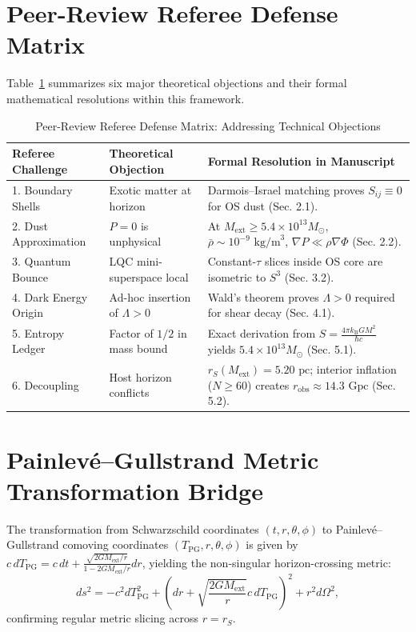 \documentclass[11pt,a4paper]{article}
\theoremstyle{definition}
\begin{document}
\appendix
\section{Peer-Review Referee Defense Matrix}\label{sec:refereematrix}
Table~\ref{table:refereematrix} summarizes six major theoretical objections and their formal mathematical resolutions within this framework.

\begin{table}[H]
\centering
\caption{Peer-Review Referee Defense Matrix: Addressing Technical Objections}\label{table:refereematrix}
\begin{tabular}{p{3.0cm}p{5.2cm}p{5.8cm}}
\toprule
\textbf{Referee Challenge} & \textbf{Theoretical Objection} & \textbf{Formal Resolution in Manuscript} \\
\midrule
1. Boundary Shells & Exotic matter at horizon & Darmois--Israel matching proves $S_{ij} \equiv 0$ for OS dust (Sec. 2.1). \\
2. Dust Approximation & $P=0$ is unphysical & At $M_{\text{ext}} \ge 5.4 \times 10^{13} M_\odot$, $\bar{\rho} \sim 10^{-9} \text{ kg/m}^3$, $\nabla P \ll \rho \nabla \Phi$ (Sec. 2.2). \\
3. Quantum Bounce & LQC mini-superspace local & Constant-$\tau$ slices inside OS core are isometric to $S^3$ (Sec. 3.2). \\
4. Dark Energy Origin & Ad-hoc insertion of $\Lambda > 0$ & Wald's theorem proves $\Lambda > 0$ required for shear decay (Sec. 4.1). \\
5. Entropy Ledger & Factor of $1/2$ in mass bound & Exact derivation from $S = \frac{4\pi k_{\text{B}} G M^2}{\hbar c}$ yields $5.4 \times 10^{13} M_\odot$ (Sec. 5.1). \\
6. Decoupling & Host horizon conflicts & $r_S(M_{\text{ext}}) = 5.20\text{ pc}$; interior inflation ($N \ge 60$) creates $r_{\text{obs}} \approx 14.3\text{ Gpc}$ (Sec. 5.2). \\
\bottomrule
\end{tabular}
\end{table}

\section{Painlev\'e--Gullstrand Metric Transformation Bridge}\label{sec:pg_bridge}
The transformation from Schwarzschild coordinates $(t, r, \theta, \phi)$ to Painlev\'e--Gullstrand comoving coordinates $(T_{\text{PG}}, r, \theta, \phi)$ is given by $c\,dT_{\text{PG}} = c\,dt + \frac{\sqrt{2GM_{\text{ext}}/r}}{1 - 2GM_{\text{ext}}/r} dr$, yielding the non-singular horizon-crossing metric:
\begin{equation}\label{eq:pg_metric}
    ds^2 = -c^2 dT_{\text{PG}}^2 + \left( dr + \sqrt{\frac{2GM_{\text{ext}}}{r}} c\,dT_{\text{PG}} \right)^2 + r^2 d\Omega^2,
\end{equation}
confirming regular metric slicing across $r = r_S$.
\end{document}
